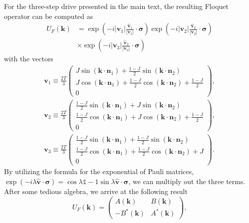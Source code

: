 \documentclass[aps,prb,twocolumn,superscriptaddress,groupedaddress]{revtex4}
\begin{document}
For the three-step drive presented in the main text, the resulting Floquet operator can be computed as
%
\begin{align}
U_F(\mathbf{k}) &= \exp \left( -i |\mathbf{v}_1| \frac{\hat{\mathbf{v}}_1}{|\mathbf{v}_1|} \cdot \boldsymbol{\sigma} \right)
\exp \left( -i |\mathbf{v}_2| \frac{\hat{\mathbf{v}}_2}{|\mathbf{v}_2|} \cdot \boldsymbol{\sigma} \right) \nonumber \\
&\times
\exp \left(-i |\mathbf{v}_3| \frac{\hat{\mathbf{v}}_3}{|\mathbf{v}_3|} \cdot \boldsymbol{\sigma} \right)
\end{align}
%
with the vectors
%
\begin{align}
\mathbf{v}_1 \equiv \frac{2T}{3} \left( \begin{array}{c} 
J \sin(\mathbf{k} \cdot \mathbf{n}_1) +  \frac{1-J}{2} \sin(\mathbf{k} \cdot \mathbf{n}_2) \\
J \cos(\mathbf{k} \cdot \mathbf{n}_1) +  \frac{1-J}{2} \cos(\mathbf{k} \cdot \mathbf{n}_2) + \frac{1-J}{2} \\
0 \end{array} \right), \\
\mathbf{v}_2 \equiv \frac{2T}{3} \left( \begin{array}{c} 
\frac{1-J}{2} \sin(\mathbf{k} \cdot \mathbf{n}_1) +  J \sin(\mathbf{k} \cdot \mathbf{n}_2) \\
\frac{1-J}{2} \cos(\mathbf{k} \cdot \mathbf{n}_1) +  J \cos(\mathbf{k} \cdot \mathbf{n}_2) + \frac{1-J}{2} \\
0 \end{array} \right), \\
\mathbf{v}_3 \equiv \frac{2T}{3} \left( \begin{array}{c} 
\frac{1-J}{2} \sin(\mathbf{k} \cdot \mathbf{n}_1) +  \frac{1-J}{2} \sin(\mathbf{k} \cdot \mathbf{n}_2) \\
\frac{1-J}{2} \cos(\mathbf{k} \cdot \mathbf{n}_1) +  \frac{1-J}{2} \cos(\mathbf{k} \cdot \mathbf{n}_2) + J \\
0 \end{array} \right).
\end{align}
%
By utilizing the formula for the exponential of Pauli matrices, $\exp \left( -i\lambda \hat{\mathbf{v}} \cdot \boldsymbol{\sigma} \right) = \cos \lambda \mathds{1} - 1 \sin \lambda \hat{\mathbf{v}} \cdot \boldsymbol{\sigma}$, we can multiply out the three terms.
After some tedious algebra, we arrive at the following result
%
\begin{equation}
U_F(\mathbf{k}) = \left( \begin{array}{cc}
A(\mathbf{k}) & B(\mathbf{k}) \\
-B^*(\mathbf{k}) & A^*(\mathbf{k})
\end{array}
\right),
\end{equation}
\end{document}
